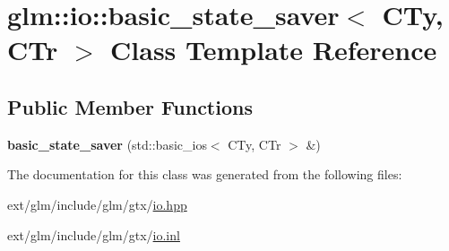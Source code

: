 \hypertarget{classglm_1_1io_1_1basic__state__saver}{\section{glm\-:\-:io\-:\-:basic\-\_\-state\-\_\-saver$<$ C\-Ty, C\-Tr $>$ Class Template Reference}
\label{classglm_1_1io_1_1basic__state__saver}
}
\subsection*{Public Member Functions}
\begin{DoxyCompactItemize}
\item 
\hypertarget{classglm_1_1io_1_1basic__state__saver_ab31652b0b7f2a24fa8f9fda2505de356}{{\bfseries basic\-\_\-state\-\_\-saver} (std\-::basic\-\_\-ios$<$ C\-Ty, C\-Tr $>$ \&)}\label{classglm_1_1io_1_1basic__state__saver_ab31652b0b7f2a24fa8f9fda2505de356}

\end{DoxyCompactItemize}


The documentation for this class was generated from the following files\-:\begin{DoxyCompactItemize}
\item 
ext/glm/include/glm/gtx/\hyperlink{io_8hpp}{io.\-hpp}\item 
ext/glm/include/glm/gtx/\hyperlink{io_8inl}{io.\-inl}\end{DoxyCompactItemize}
